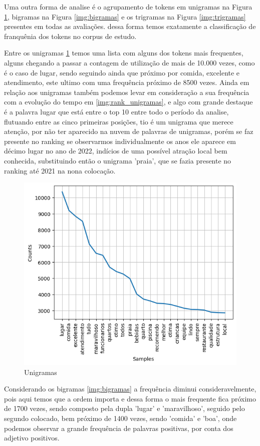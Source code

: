 Uma outra forma de analise é o agrupamento de tokens em unigramas na Figura \ref{img:unigramas}, bigramas na Figura \ref{img:bigramas} e os trigramas na Figura \ref{img:trigramas} presentes em todas as avaliações. dessa forma temos exatamente a classificação de franquênia dos tokens no corpus de estudo.

Entre os unigramas \ref{img:unigramas} temos uma lista com alguns dos tokens mais frequentes, alguns chegando a passar a contagem de utilização de mais de 10.000 vezes, como é o caso de lugar, sendo seguindo ainda que próximo por comida, excelente e atendimento, este ultimo com uma frequência próximo de 8500 vezes. Ainda em relação aos unigramas também podemos levar em consideração a sua frequência com a evolução do tempo em \ref{img:rank_unigramas}, e algo com grande destaque é a palavra lugar que está entre o top 10 entre todo o período da analise, flutuando entre as cinco primeiras posições, tio é um unigrama que merece atenção, por não ter aparecido na nuvem de palavras de unigramas, porém se faz presente no ranking se observarmos individualmente os anos ele aparece em décimo lugar no ano de 2022, indícios de uma possível atração local bem conhecida, substituindo então o unigrama 'praia', que se fazia presente no ranking até 2021 na nona colocação.

\begin{figure}
	\centering
	\includegraphics[width=.8\textwidth]{figs/exploratoria/unigramas.png}
	\caption{Unigramas}
	\label{img:unigramas}
\end{figure}

Considerando os bigramas \ref{img:bigramas} a frequência diminui consideravelmente, pois aqui temos que a ordem importa e dessa forma o mais frequente fica próximo de 1700 vezes, sendo composto pela dupla 'lugar' e 'maravilhoso', seguido pelo segundo colocado, bem próximo de 1400 vezes, sendo 'comida' e 'boa', onde podemos observar a grande frequência de palavras positivas, por conta dos adjetivo positivos.

